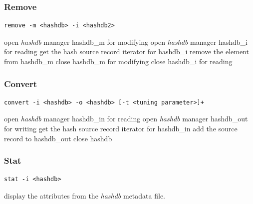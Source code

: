 \documentclass[12pt,twoside]{article}
\newcommand{\hdb}{\emph{hashdb}\xspace}
\begin{document}
\subsubsection{Remove}
\begin{small}
\begin{verbatim}
remove -m <hashdb> -i <hashdb2>
\end{verbatim}
\end{small}
\begin{algorithmic}
\STATE open \hdb manager hashdb\_m for modifying
\STATE open \hdb manager hashdb\_i for reading
\STATE get the hash source record iterator for hashdb\_i
  \STATE remove the element from hashdb\_m
\ENDFOR
\STATE close hashdb\_m for modifying
\STATE close hashdb\_i for reading
\end{algorithmic}

\subsubsection{Convert}
\begin{small}
\begin{verbatim}
convert -i <hashdb> -o <hashdb> [-t <tuning parameter>]+
\end{verbatim}
\end{small}
\begin{algorithmic}
\STATE open \hdb manager hashdb\_in for reading
\STATE open \hdb manager hashdb\_out for writing
\STATE get the hash source record iterator for hashdb\_in
  \STATE add the source record to hashdb\_out
\ENDFOR
\STATE close hashdb
\end{algorithmic}

\subsubsection{Stat}
\begin{small}
\begin{verbatim}
stat -i <hashdb>
\end{verbatim}
\end{small}
\begin{algorithmic}
\STATE display the attributes from the \hdb metadata file.
\end{algorithmic}
\end{document}
